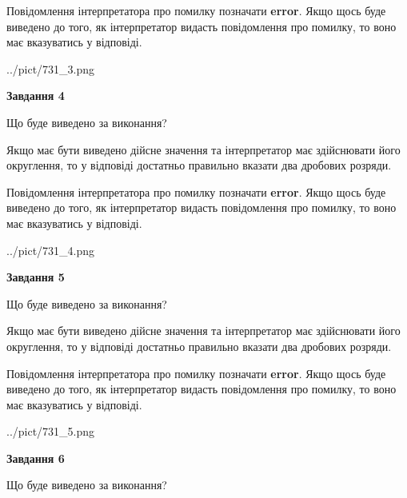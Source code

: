 \documentclass[12pt, ukrainian]{article}
\begin{document}
{\begin {Large}
Повідомлення інтерпретатора про помилку позначати \textbf{error}.
Якщо щось буде виведено до того, як інтерпретатор видасть повідомлення про помилку, 
то воно має вказуватись у відповіді. \par

\begin{center}
	{../pict/731_3.png}
\end{center}
\newpage

{\begin {center}\textbf{Завдання 4}\end {center}}\par
Що буде виведено за виконання? \par

Якщо має бути виведено дійсне значення та інтерпретатор має здійснювати його округлення, 
то у відповіді достатньо правильно вказати два дробових розряди.

Повідомлення інтерпретатора про помилку позначати \textbf{error}.
Якщо щось буде виведено до того, як інтерпретатор видасть повідомлення про помилку, 
то воно має вказуватись у відповіді. \par

\begin{center}
	{../pict/731_4.png}
\end{center}
\newpage

{\begin {center}\textbf{Завдання 5}\end {center}}\par
Що буде виведено за виконання? \par

Якщо має бути виведено дійсне значення та інтерпретатор має здійснювати його округлення, 
то у відповіді достатньо правильно вказати два дробових розряди.

Повідомлення інтерпретатора про помилку позначати \textbf{error}.
Якщо щось буде виведено до того, як інтерпретатор видасть повідомлення про помилку, 
то воно має вказуватись у відповіді. \par

\begin{center}
	{../pict/731_5.png}
\end{center}
\newpage

{\begin {center}\textbf{Завдання 6}\end {center}}\par
Що буде виведено за виконання? \par


\end{Large}}
\end{document}
